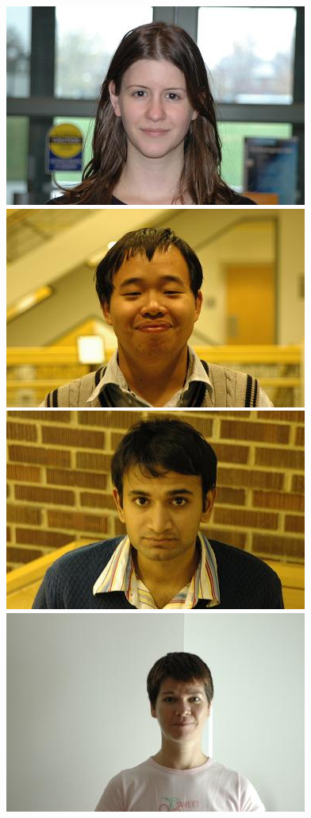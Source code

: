 \documentclass[10pt,journal,letterpaper,compsoc]{IEEEtran} %
\begin{document}
\begin{figure}
\centering
\includegraphics[scale=0.75,clip=true]{figures_pami/uiuc_example/normal_indoor/DSC_1318.JPG}
\includegraphics[scale=0.75,clip=true]{figures_pami/uiuc_example/normal_indoor/DSC_1521.JPG}
\includegraphics[scale=0.75,clip=true]{figures_pami/uiuc_example/normal_indoor/DSC_1673.JPG}
\includegraphics[scale=0.75,clip=true]{figures_pami/uiuc_example/normal_indoor/DSC_1732.JPG}

\end{figure}
\end{document}
